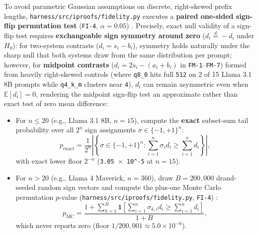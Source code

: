 \documentclass[11pt,letterpaper]{article}
\begin{document}
To avoid parametric Gaussian assumptions on discrete, right-skewed prefix lengths, \texttt{harness/\allowbreak{}src/\allowbreak{}iproofs/\allowbreak{}fidelity.\allowbreak{}py} executes a \textbf{paired one-sided sign-flip permutation test} (\texttt{FI-4}, $\alpha = 0.05$) \cite{iproofs2026}. Precisely, exact null validity of a sign-flip test requires \textbf{exchangeable sign symmetry around zero} ($d_i \stackrel{d}{=} -d_i$ under $H_0$): for two-system contrasts ($d_i = s_i - b_i$), symmetry holds naturally under the sharp null that both systems draw from the same distribution per prompt; however, for \textbf{midpoint contrasts} ($d_i = 2s_i - (a_i + b_i)$ in \texttt{FM-1}--\texttt{FM-7}) formed from heavily right-skewed controls (where \texttt{q8\_\allowbreak{}0} hits full \texttt{512} on 2 of 15 Llama 3.1 8B prompts while \texttt{q4\_\allowbreak{}k\_\allowbreak{}m} clusters near \texttt{4}), $d_i$ can remain asymmetric even when $\mathbb{E}[d_i] = 0$, rendering the midpoint sign-flip test an approximate rather than exact test of zero mean difference:

\begin{itemize}
\item For $n \le 20$ (e.g., Llama 3.1 8B, $n = 15$), compute the \textbf{exact} subset-sum tail probability over all $2^n$ sign assignments $\sigma \in \{-1, +1\}^n$:
\[
p_{\text{exact}} = \frac{1}{2^n} \left|\left\{\sigma \in \{-1, +1\}^n : \sum_{i=1}^n \sigma_i d_i \ge \sum_{i=1}^n d_i \right\}\right|,
\] with exact lower floor $2^{-n}$ (\texttt{3.05 $\times$ 10\textasciicircum{}-5} at $n = 15$).
\item For $n > 20$ (e.g., Llama 4 Maverick, $n = 360$), draw $B = 200{,}000$ drand-seeded random sign vectors and compute the plus-one Monte Carlo permutation $p$-value (\texttt{harness/\allowbreak{}src/\allowbreak{}iproofs/\allowbreak{}fidelity.\allowbreak{}py}, \texttt{FI-4}) \cite{iproofs2026}:
\[
p_{\text{MC}} = \frac{1 + \sum_{k=1}^{B} \mathbf{1}\!\left[\sum_{i=1}^n \sigma_{k,i} d_i \ge \sum_{i=1}^n d_i\right]}{1 + B},
\] which never reports zero (floor $1 / 200{,}001 \approx 5.0 \times 10^{-6}$).
\end{itemize}
\end{document}
